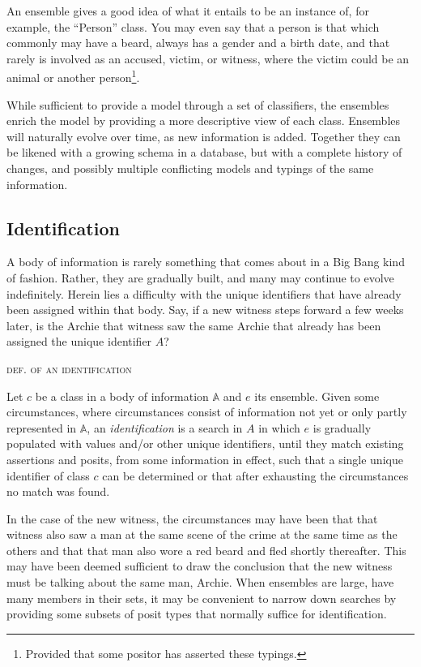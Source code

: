 \documentclass[sfsidenotes,nobib,twoside,symmetric]{tufte-handout}
\newcounter{majorcount}
\newcommand{\deffy}[3]{
	\vspace{2ex}
	\refstepcounter{majorcount} 
	\noindent\textsc{#1}%
	\\\begin{small}
	\noindent #2%
	\label{Def:#3}
	\end{small}
	\vspace{2ex}
}
\begin{document}
An ensemble gives a good idea of what it entails to be an instance of, for example, the \enquote{Person} class. You may even say that a person is that which commonly may have a beard, always has a gender and a birth date, and that rarely is involved as an accused, victim, or witness, where the victim could be an animal or another person\footnote{Provided that some positor has asserted these typings.}.

While sufficient to provide a model through a set of classifiers, the ensembles enrich the model by providing a more descriptive view of each class. Ensembles will naturally evolve over time, as new information is added. Together they can be likened with a growing schema in a database, but with a complete history of changes, and possibly multiple conflicting models and typings of the same information.

\subsection{Identification}
%
A body of information is rarely something that comes about in a Big Bang kind of fashion. Rather, they are gradually built, and many may continue to evolve indefinitely. Herein lies a difficulty with the unique identifiers that have already been assigned within that body. Say, if a new witness steps forward a few weeks later, is the Archie that witness saw the same Archie that already has been assigned the unique identifier $A$? 

\deffy{def. of an identification}{%
Let $c$ be a class in a body of information $\mathbb{A}$ and $e$ its ensemble. Given some circumstances, where circumstances consist of information not yet or only partly represented in $\mathbb{A}$, an \emph{identification} is a search in $A$ in which $e$ is gradually populated with values and/or other unique identifiers, until they match existing assertions and posits, from some information in effect, such that a single unique identifier of class $c$ can be determined or that after exhausting the circumstances no match was found.
}{identification}

In the case of the new witness, the circumstances may have been that that witness also saw a man at the same scene of the crime at the same time as the others and that that man also wore a red beard and fled shortly thereafter. This may have been deemed sufficient to draw the conclusion that the new witness must be talking about the same man, Archie. When ensembles are large, have many members in their sets, it may be convenient to narrow down searches by providing some subsets of posit types that normally suffice for identification.
\end{document}
